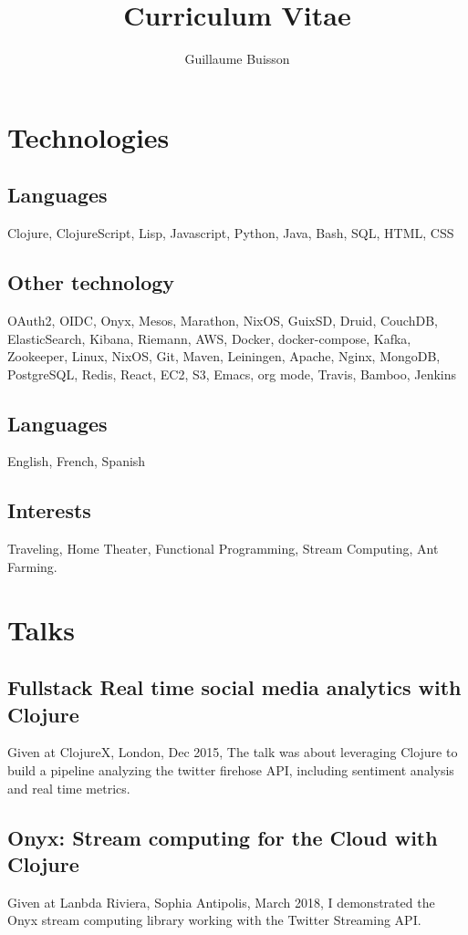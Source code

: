 \documentclass{article}
\title{Curriculum Vitae}
\author{Guillaume Buisson}
\date{}
\begin{document}
\maketitle
\section*{Technologies}
\subsection*{Languages}
Clojure, ClojureScript, Lisp, Javascript, Python, Java, Bash, SQL, HTML, CSS

\subsection*{Other technology}
OAuth2, OIDC, Onyx, Mesos, Marathon, NixOS, GuixSD, Druid, CouchDB, ElasticSearch, Kibana, Riemann, AWS, Docker, docker-compose, Kafka, Zookeeper, Linux, NixOS, Git, Maven, Leiningen, Apache, Nginx, MongoDB, PostgreSQL, Redis, React, EC2, S3, Emacs, org mode, Travis, Bamboo, Jenkins

\subsection*{Languages}
English, French, Spanish

\subsection*{Interests}
Traveling, Home Theater, Functional Programming, Stream Computing, Ant Farming.

\section*{Talks}
\subsection*{Fullstack Real time social media analytics with Clojure}
Given at ClojureX, London, Dec 2015, The talk was about
leveraging Clojure to build a pipeline analyzing the twitter firehose API,
including sentiment analysis and real time metrics.

\subsection*{Onyx: Stream computing for the Cloud with Clojure}
Given at Lanbda Riviera, Sophia Antipolis, March 2018, I demonstrated the Onyx stream computing
library working with the Twitter Streaming API.
\end{document}
